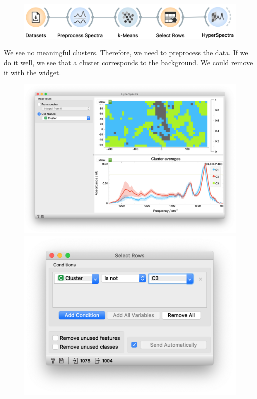 \begin{figure}
  \centering
  \vspace{-0.4cm}
  \includegraphics[width=1.1\textwidth]{graphics/ch-spectra_image_clustering/sp_image_clustering-fig3.png}%
  \label{fig:spectra_image_clustering-fig3}
\end{figure}
We see no meaningful clusters. Therefore, we need to preprocess the data. If we do it well, we see that a cluster corresponds to the background. We could remove it with the  widget.

\begin{figure}[h]
\vspace{-0.8cm}
\hspace{-0.8cm}
  {\includegraphics[scale=0.25]{graphics/ch-spectra_image_clustering/sp_image_clustering-fig4b.png}}
  {\includegraphics[scale=0.45]{graphics/ch-spectra_image_clustering/sp_image_clustering-fig4a.png}}
  \label{ffig:spectra_image_clustering-fig4}
\end{figure}
